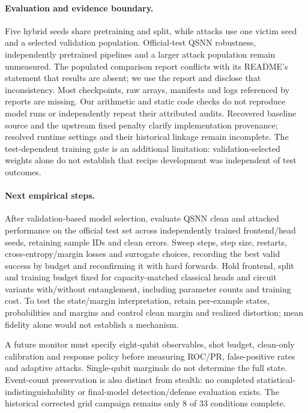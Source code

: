 \paragraph{Evaluation and evidence boundary.}
Five hybrid seeds share pretraining and split, while attacks use one victim seed and a selected validation population. Official-test QSNN robustness, independently pretrained pipelines and a larger attack population remain unmeasured. The populated comparison report conflicts with its README's statement that results are absent; we use the report and disclose that inconsistency. Most checkpoints, raw arrays, manifests and logs referenced by reports are missing. Our arithmetic and static code checks do not reproduce model runs or independently repeat their attributed audits. Recovered baseline source and the upstream fixed penalty clarify implementation provenance; resolved runtime settings and their historical linkage remain incomplete. The test-dependent training gate is an additional limitation: validation-selected weights alone do not establish that recipe development was independent of test outcomes.

\paragraph{Next empirical steps.}
After validation-based model selection, evaluate QSNN clean and attacked performance on the official test set across independently trained frontend/head seeds, retaining sample IDs and clean errors. Sweep steps, step size, restarts, cross-entropy/margin losses and surrogate choices, recording the best valid success by budget and reconfirming it with hard forwards. Hold frontend, split and training budget fixed for capacity-matched classical heads and circuit variants with/without entanglement, including parameter counts and training cost. To test the state/margin interpretation, retain per-example states, probabilities and margins and control clean margin and realized distortion; mean fidelity alone would not establish a mechanism.

A future monitor must specify eight-qubit observables, shot budget, clean-only calibration and response policy before measuring ROC/PR, false-positive rates and adaptive attacks. Single-qubit marginals do not determine the full state. Event-count preservation is also distinct from stealth: no completed statistical-indistinguishability or final-model detection/defense evaluation exists. The historical corrected grid campaign remains only 8 of 33 conditions complete.

